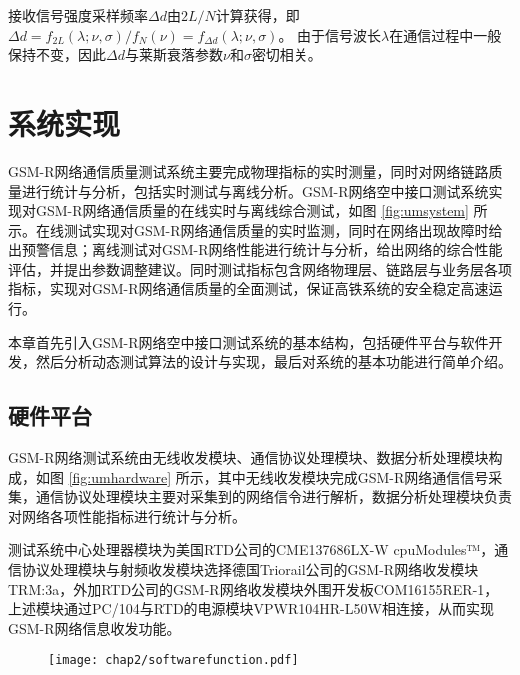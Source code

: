 接收信号强度采样频率$\Delta d$由$2L/N$计算获得，即$\Delta d=f_{2L}(\lambda;\nu,\sigma)/f_{N}(\nu)=f_{\Delta d}(\lambda;\nu,\sigma)$。 由于信号波长$\lambda$在通信过程中一般保持不变，因此$\Delta d$与莱斯衰落参数$\nu$和$\sigma$密切相关。

\section{系统实现}
\label{sec:system_phy}

GSM-R网络通信质量测试系统主要完成物理指标的实时测量，同时对网络链路质量进行统计与分析，包括实时测试与离线分析。GSM-R网络空中接口测试系统实现对GSM-R网络通信质量的在线实时与离线综合测试，如图 \ref{fig:umsystem} 所示。在线测试实现对GSM-R网络通信质量的实时监测，同时在网络出现故障时给出预警信息；离线测试对GSM-R网络性能进行统计与分析，给出网络的综合性能评估，并提出参数调整建议。同时测试指标包含网络物理层、链路层与业务层各项指标，实现对GSM-R网络通信质量的全面测试，保证高铁系统的安全稳定高速运行。

本章首先引入GSM-R网络空中接口测试系统的基本结构，包括硬件平台与软件开发，然后分析动态测试算法的设计与实现，最后对系统的基本功能进行简单介绍。

\subsection{硬件平台}
\label{sec:um}

GSM-R网络测试系统由无线收发模块、通信协议处理模块、数据分析处理模块构成，如图 \ref{fig:umhardware} 所示，其中无线收发模块完成GSM-R网络通信信号采集，通信协议处理模块主要对采集到的网络信令进行解析，数据分析处理模块负责对网络各项性能指标进行统计与分析。

测试系统中心处理器模块为美国RTD公司的CME137686LX-W cpuModules™，通信协议处理模块与射频收发模块选择德国Triorail公司的GSM-R网络收发模块TRM:3a，外加RTD公司的GSM-R网络收发模块外围开发板COM16155RER-1，上述模块通过PC/104与RTD的电源模块VPWR104HR-L50W相连接，从而实现GSM-R网络信息收发功能。

\begin{figure}[!htp]
\centering
    \texttt{[image: chap2/softwarefunction.pdf]}
\end{figure}

